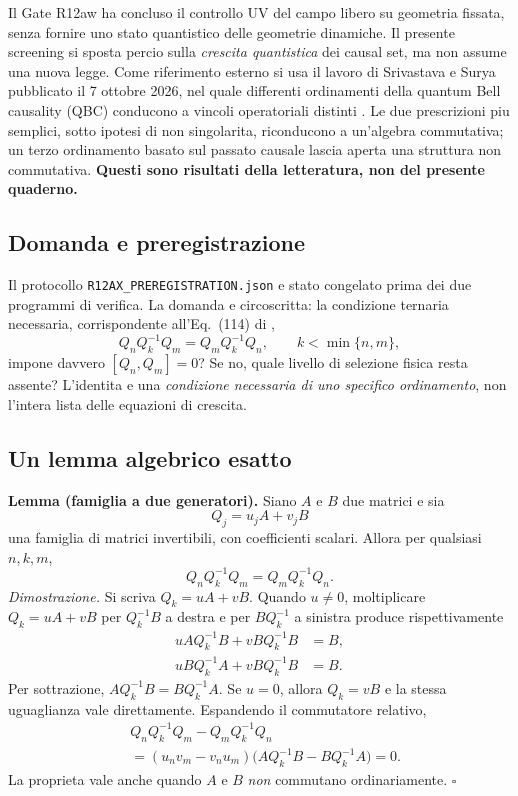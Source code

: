 \documentclass[11pt,a4paper]{article}
\begin{document}
Il Gate R12aw ha concluso il controllo UV del campo libero su geometria fissata, senza fornire uno stato quantistico delle geometrie dinamiche. Il presente screening si sposta percio sulla \emph{crescita quantistica} dei causal set, ma non assume una nuova legge. Come riferimento esterno si usa il lavoro di Srivastava e Surya pubblicato il 7 ottobre 2026, nel quale differenti ordinamenti della quantum Bell causality (QBC) conducono a vincoli operatoriali distinti \cite{SrivastavaSurya2026}. Le due prescrizioni piu semplici, sotto ipotesi di non singolarita, riconducono a un'algebra commutativa; un terzo ordinamento basato sul passato causale lascia aperta una struttura non commutativa. \textbf{Questi sono risultati della letteratura, non del presente quaderno.}

\subsection{Domanda e preregistrazione}
Il protocollo \texttt{R12AX\_PREREGISTRATION.json} e stato congelato prima dei due programmi di verifica. La domanda e circoscritta: la condizione ternaria necessaria, corrispondente all'Eq.~(114) di \cite{SrivastavaSurya2026},
\begin{equation}
 Q_n Q_k^{-1}Q_m = Q_m Q_k^{-1}Q_n,\qquad k<\min\{n,m\},
 \label{eq:r12ax-ternary}
\end{equation}
impone davvero $[Q_n,Q_m]=0$? Se no, quale livello di selezione fisica resta assente? L'identita e una \emph{condizione necessaria di uno specifico ordinamento}, non l'intera lista delle equazioni di crescita.

\subsection{Un lemma algebrico esatto}
\textbf{Lemma (famiglia a due generatori).} Siano $A$ e $B$ due matrici e sia
\begin{equation}
 Q_j=u_jA+v_jB
\end{equation}
una famiglia di matrici invertibili, con coefficienti scalari. Allora per qualsiasi $n,k,m$,
\begin{equation}
 Q_nQ_k^{-1}Q_m=Q_mQ_k^{-1}Q_n.
 \label{eq:r12ax-lemma}
\end{equation}
\textit{Dimostrazione.} Si scriva $Q_k=uA+vB$. Quando $u\ne0$, moltiplicare $Q_k=uA+vB$ per $Q_k^{-1}B$ a destra e per $BQ_k^{-1}$ a sinistra produce rispettivamente
\begin{align}
 u A Q_k^{-1}B+vB Q_k^{-1}B&=B,\\
 u B Q_k^{-1}A+vB Q_k^{-1}B&=B.
\end{align}
Per sottrazione, $AQ_k^{-1}B=BQ_k^{-1}A$. Se $u=0$, allora $Q_k=vB$ e la stessa uguaglianza vale direttamente. Espandendo il commutatore relativo,
\begin{align}
 &Q_nQ_k^{-1}Q_m-Q_mQ_k^{-1}Q_n\\
 &= (u_nv_m-v_nu_m)
 \bigl(AQ_k^{-1}B-BQ_k^{-1}A\bigr)=0.
\end{align}
La proprieta vale anche quando $A$ e $B$ \emph{non} commutano ordinariamente. $\square$
\end{document}
